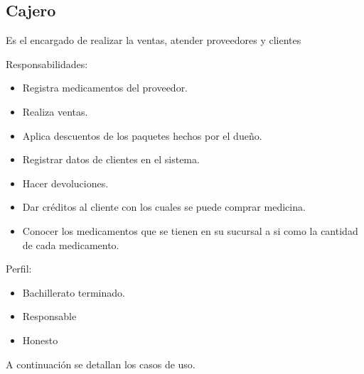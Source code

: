 \begin{Usuario}{\hypertarget{Empleado}{\subsection{Cajero}}}{
	Es el encargado de realizar la ventas, atender proveedores y clientes
}
    \item[Responsabilidades:] \cdtEmpty
    \begin{itemize}
		\item Registra medicamentos del proveedor.
		\item Realiza ventas.
		\item Aplica descuentos de los paquetes hechos por el dueño.
		\item Registrar datos de clientes en el sistema.
		\item Hacer devoluciones.
		\item Dar créditos al cliente con los cuales se puede comprar medicina.
		\item Conocer los medicamentos que se tienen en su sucursal a si como la cantidad de cada medicamento.
    \end{itemize}

	\item[Perfil:] \cdtEmpty
    \begin{itemize}
		\item Bachillerato terminado.
		\item Responsable
		\item Honesto
    \end{itemize}
\end{Usuario}
A continuación se detallan los casos de uso.

